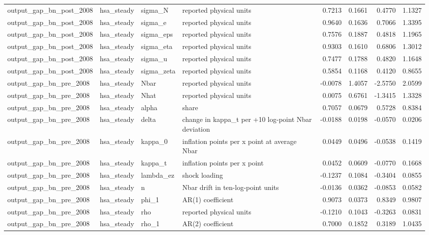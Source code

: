\begin{tabular}{llllrrrr}
output\_gap\_bn\_post\_2008 & hsa\_steady & sigma\_N & reported physical units & 0.7213 & 0.1661 & 0.4770 & 1.1327 \\
output\_gap\_bn\_post\_2008 & hsa\_steady & sigma\_e & reported physical units & 0.9640 & 0.1636 & 0.7066 & 1.3395 \\
output\_gap\_bn\_post\_2008 & hsa\_steady & sigma\_eps & reported physical units & 0.7576 & 0.1887 & 0.4818 & 1.1965 \\
output\_gap\_bn\_post\_2008 & hsa\_steady & sigma\_eta & reported physical units & 0.9303 & 0.1610 & 0.6806 & 1.3012 \\
output\_gap\_bn\_post\_2008 & hsa\_steady & sigma\_u & reported physical units & 0.7477 & 0.1788 & 0.4820 & 1.1648 \\
output\_gap\_bn\_post\_2008 & hsa\_steady & sigma\_zeta & reported physical units & 0.5854 & 0.1168 & 0.4120 & 0.8655 \\
output\_gap\_bn\_pre\_2008 & hsa\_steady & Nbar & reported physical units & -0.0078 & 1.4057 & -2.5750 & 2.0599 \\
output\_gap\_bn\_pre\_2008 & hsa\_steady & Nhat & reported physical units & 0.0075 & 0.6761 & -1.3415 & 1.3328 \\
output\_gap\_bn\_pre\_2008 & hsa\_steady & alpha & share & 0.7057 & 0.0679 & 0.5728 & 0.8384 \\
output\_gap\_bn\_pre\_2008 & hsa\_steady & delta & change in kappa\_t per +10 log-point Nbar deviation & -0.0188 & 0.0198 & -0.0570 & 0.0206 \\
output\_gap\_bn\_pre\_2008 & hsa\_steady & kappa\_0 & inflation points per x point at average Nbar & 0.0449 & 0.0496 & -0.0538 & 0.1419 \\
output\_gap\_bn\_pre\_2008 & hsa\_steady & kappa\_t & inflation points per x point & 0.0452 & 0.0609 & -0.0770 & 0.1668 \\
output\_gap\_bn\_pre\_2008 & hsa\_steady & lambda\_ez & shock loading & -0.1237 & 0.1084 & -0.3404 & 0.0855 \\
output\_gap\_bn\_pre\_2008 & hsa\_steady & n & Nbar drift in ten-log-point units & -0.0136 & 0.0362 & -0.0853 & 0.0582 \\
output\_gap\_bn\_pre\_2008 & hsa\_steady & phi\_1 & AR(1) coefficient & 0.9073 & 0.0373 & 0.8349 & 0.9807 \\
output\_gap\_bn\_pre\_2008 & hsa\_steady & rho & reported physical units & -0.1210 & 0.1043 & -0.3263 & 0.0831 \\
output\_gap\_bn\_pre\_2008 & hsa\_steady & rho\_1 & AR(2) coefficient & 0.7000 & 0.1852 & 0.3189 & 1.0435 \\

\end{tabular}
